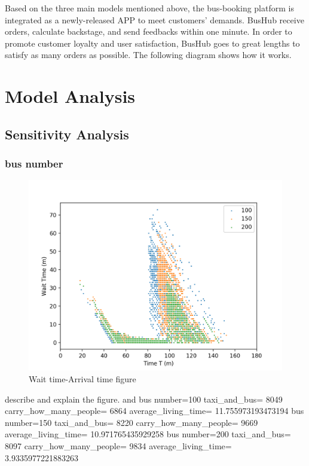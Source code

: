 \documentclass{mcmthesis}
\begin{document}
Based on the three main models mentioned above, the bus-booking platform is integrated as a newly-released APP  to meet customers' demands. BusHub receive orders, calculate backstage, and send feedbacks within one minute. In order to promote customer loyalty and user satisfaction, BusHub goes to great lengths to satisfy as many orders as possible. The following diagram shows how it works.


\section{Model Analysis}\label{sec:mode}
\subsection{Sensitivity Analysis}

\subsubsection{bus number}
\begin{figure}[htbp]
    \centering
    \includegraphics{figures/waittime.png}
    \caption{Wait time-Arrival time figure}
    \label{}
\end{figure}

describe and explain the figure. 
and 
bus number=100
taxi_and_bus= 8049
carry_how_many_people= 6864
average_living_time= 11.755973193473194
bus number=150
taxi_and_bus= 8220
carry_how_many_people= 9669
average_living_time= 10.971765435929258
bus number=200
taxi_and_bus= 8097
carry_how_many_people= 9834
average_living_time= 3.9335977221883263
\end{document}
